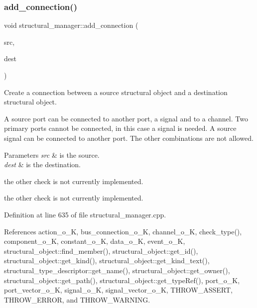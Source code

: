 \subsubsection{\texorpdfstring{add\+\_\+connection()}{add\_connection()}}
{\footnotesize\ttfamily void structural\+\_\+manager\+::add\+\_\+connection (\begin{DoxyParamCaption}\item[{\hyperlink{structural__objects_8hpp_a8ea5f8cc50ab8f4c31e2751074ff60b2}{structural\+\_\+object\+Ref}}]{src,  }\item[{\hyperlink{structural__objects_8hpp_a8ea5f8cc50ab8f4c31e2751074ff60b2}{structural\+\_\+object\+Ref}}]{dest }\end{DoxyParamCaption})}



Create a connection between a source structural object and a destination structural object. 

A source port can be connected to another port, a signal and to a channel. Two primary ports cannot be connected, in this case a signal is needed. A source signal can be connected to another port. The other combinations are not allowed. 
\begin{DoxyParams}{Parameters}
{\em src} & is the source. \\
\hline
{\em dest} & is the destination. \\
\hline
\end{DoxyParams}
the other check is not currently implemented.

the other check is not currently implemented. 

Definition at line 635 of file structural\+\_\+manager.\+cpp.



References action\+\_\+o\+\_\+K, bus\+\_\+connection\+\_\+o\+\_\+K, channel\+\_\+o\+\_\+K, check\+\_\+type(), component\+\_\+o\+\_\+K, constant\+\_\+o\+\_\+K, data\+\_\+o\+\_\+K, event\+\_\+o\+\_\+K, structural\+\_\+object\+::find\+\_\+member(), structural\+\_\+object\+::get\+\_\+id(), structural\+\_\+object\+::get\+\_\+kind(), structural\+\_\+object\+::get\+\_\+kind\+\_\+text(), structural\+\_\+type\+\_\+descriptor\+::get\+\_\+name(), structural\+\_\+object\+::get\+\_\+owner(), structural\+\_\+object\+::get\+\_\+path(), structural\+\_\+object\+::get\+\_\+type\+Ref(), port\+\_\+o\+\_\+K, port\+\_\+vector\+\_\+o\+\_\+K, signal\+\_\+o\+\_\+K, signal\+\_\+vector\+\_\+o\+\_\+K, T\+H\+R\+O\+W\+\_\+\+A\+S\+S\+E\+RT, T\+H\+R\+O\+W\+\_\+\+E\+R\+R\+OR, and T\+H\+R\+O\+W\+\_\+\+W\+A\+R\+N\+I\+NG.



